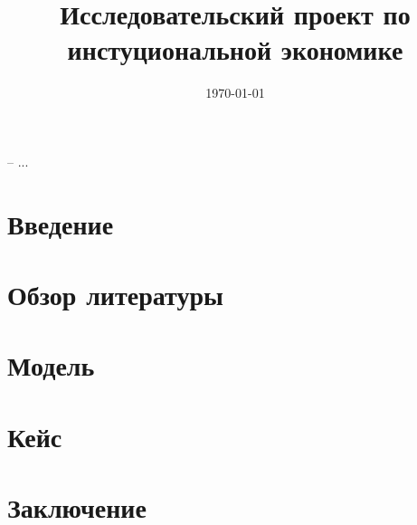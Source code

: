 \documentclass[a4paper, 12pt]{article}
\title{Исследовательский проект по инстуциональной экономике}
\date{\today}
\theoremstyle{definition}
\theoremstyle{plain}
\begin{document}
\maketitle

-- ...

\section{Введение}

\section{Обзор литературы}

\section{Модель}

\section{Кейс}

\section{Заключение}
\end{document}
